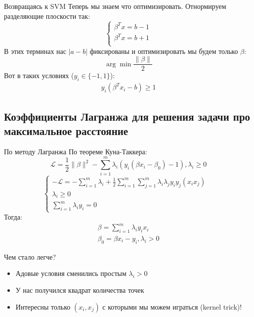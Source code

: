 \documentclass[14pt, fleqn, xcolor={dvipsnames, table}]{beamer}
\begin{document}
\begin{frame}{Возвращаясь к SVM}
\small
Теперь мы знаем что оптимизировать. Отнормируем разделяющие плоскости так:
$$
\left\{\begin{array}{l}
\beta^T x = b - 1 \\
\beta^T x = b + 1 \\
\end{array}\right.
$$
В этих терминах нас $|a - b|$ фиксированы и оптимизировать мы будем только $\beta$:
$$
\arg \min \frac{\|\beta\|}{2}
$$
Вот в таких условиях ($y_i \in \{-1,1\}$):
$$%
\begin{array}{l}
y_i(\beta^T x_i - b) \ge 1
\end{array}
$$
\end{frame}

\subsection{Коэффициенты Лагранжа для решения задачи про максимальное расстояние}
\begin{frame}{По методу Лагранжа}
По теореме Куна-Таккера: \
$$
\mathcal{L} = \frac{1}{2}\|\beta\|^2 - \sum_{i=1}^m\lambda_i(y_i(\beta x_i - \beta_0) - 1), \lambda_i \ge 0
$$ 
$$
\left\{  
           \begin{array}{ll}  
            -\mathcal{L} = -\sum_{i=1}^m\lambda_i + \frac{1}{2}\sum_{i=1}^m\sum_{j=1}^m\lambda_i\lambda_j y_i y_j (x_i x_j) \\  
            \lambda_i \ge 0 & \\
            \sum_{i=1}^m\lambda_i y_i = 0
           \end{array}   
           \right.
$$
Тогда: \
$$\begin{array}{l}
\beta = \sum_{i=1}^m\lambda_i y_i x_i \\
\beta_0 = \beta x_i - y_i, \lambda_i > 0
\end{array}$$
\end{frame}

\begin{frame}{Чем стало легче?}
\begin{itemize}
  \item Адовые условия сменились простым $\lambda_i > 0$
  \item У нас получился квадрат количества точек
  \item Интересны только $(x_i, x_j)$ с которыми мы можем играться (kernel trick)!
\end{itemize}
\end{frame}
\end{document}

